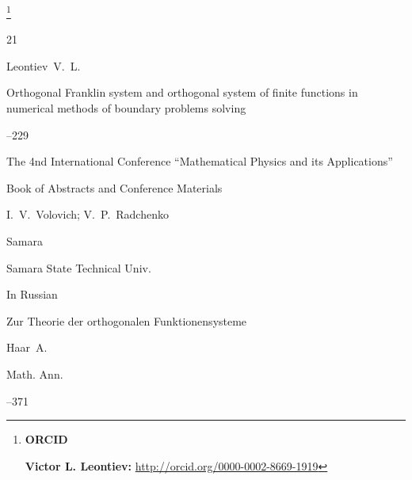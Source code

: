 \thanks{{\bf ORCID}



{\bf Victor L. Leontiev:} \url{http://orcid.org/0000-0002-8669-1919}







}



\renewcommand{\baselinestretch}{0.83}



\pagebreak





\EngRef







\begin{thebibliography}{21}




\by Leontiev~V.~L.

\paper Orthogonal Franklin system and orthogonal system of finite functions in numerical methods of boundary problems solving

--229

\inbook  The 4nd International Conference ``Mathematical Physics and its Applications''

\bookinfo Book of Abstracts and Conference Materials

\eds I.~V.~Volovich; V.~P.~Radchenko

\publaddr Samara

\publ Samara State Technical Univ.


\lang In Russian




\paper  Zur Theorie der orthogonalen Funktionensysteme 

\by Haar~A.

\jour Math. Ann. 



--371







\end{thebibliography}
